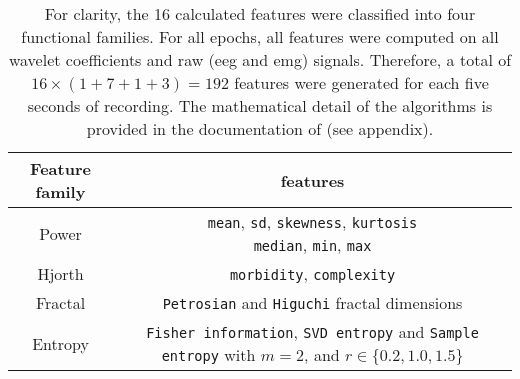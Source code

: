 \begin {table}[!h]
\begin{center}
\caption{
For clarity, the 16 calculated features were classified into four functional families.
For all epochs, all features were computed on all wavelet coefficients and raw (\gls{eeg} and \gls{emg}) signals. Therefore, a total of
$16 \times (1+7 + 1 + 3) = 192$ features were generated for each five seconds of recording.
The mathematical detail of the algorithms is provided in the documentation of \pr{} (see appendix).
\label{tab:features}}

\small
\begin{tabular}{|c|c|}
  \hline
  Feature family & features\\
 \hline
 \hline
  Power & \specialcell{\texttt{mean}, \texttt{sd}, \texttt{skewness}, \texttt{kurtosis}\\\texttt{median}, \texttt{min}, \texttt{max}}\\
  \hline
  Hjorth\cite{hjorth_eeg_1970} & \texttt{morbidity}, \texttt{complexity}\\
  \hline
  Fractal & \texttt{Petrosian}\cite{petrosian_kolmogorov_1995} and
  \texttt{Higuchi}\cite{higuchi_approach_1988} fractal dimensions\\
  \hline
  Entropy & \specialcell{\texttt{Fisher information}, \texttt{SVD entropy}\\and
  \texttt{Sample entropy}\cite{richman_physiological_2000} with $m=2$, and $ r
  \in \{ 0.2, 1.0, 1.5\}$}\\
 \hline



\end{tabular}
\end{center}
\end{table}

